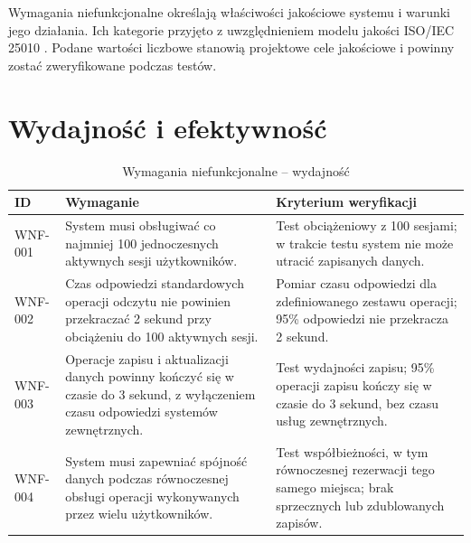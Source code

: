 \documentclass[12pt,a4paper,oneside]{report}
\begin{document}
Wymagania niefunkcjonalne określają właściwości jakościowe systemu i warunki jego działania. Ich kategorie przyjęto z uwzględnieniem modelu jakości ISO/IEC 25010 \cite{iso25010}. Podane wartości liczbowe stanowią projektowe cele jakościowe i powinny zostać zweryfikowane podczas testów.

\section{Wydajność i efektywność}
\begin{longtable}{|p{1.5cm}|p{8.4cm}|p{3.5cm}|}
\caption{Wymagania niefunkcjonalne -- wydajność}\label{tab:wnf-wydajnosc}\\\hline
\rowcolor{lightblue}\textbf{ID} & \textbf{Wymaganie} & \textbf{Kryterium weryfikacji}\\\hline
WNF-001 & System musi obsługiwać co najmniej 100 jednoczesnych aktywnych sesji użytkowników. & Test obciążeniowy z 100 sesjami; w trakcie testu system nie może utracić zapisanych danych.\\\hline
WNF-002 & Czas odpowiedzi standardowych operacji odczytu nie powinien przekraczać 2 sekund przy obciążeniu do 100 aktywnych sesji. & Pomiar czasu odpowiedzi dla zdefiniowanego zestawu operacji; 95\% odpowiedzi nie przekracza 2 sekund.\\\hline
WNF-003 & Operacje zapisu i aktualizacji danych powinny kończyć się w czasie do 3 sekund, z wyłączeniem czasu odpowiedzi systemów zewnętrznych. & Test wydajności zapisu; 95\% operacji zapisu kończy się w czasie do 3 sekund, bez czasu usług zewnętrznych.\\\hline
WNF-004 & System musi zapewniać spójność danych podczas równoczesnej obsługi operacji wykonywanych przez wielu użytkowników. & Test współbieżności, w tym równoczesnej rezerwacji tego samego miejsca; brak sprzecznych lub zdublowanych zapisów.\\\hline
\end{longtable}
\end{document}

